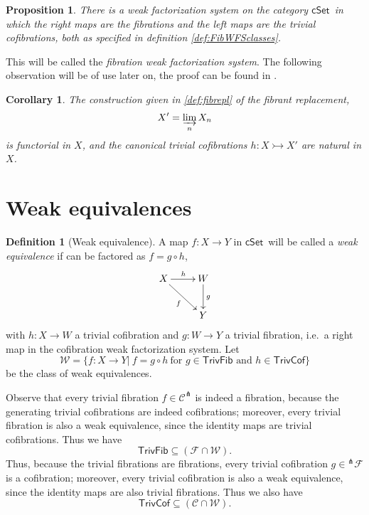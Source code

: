 \documentclass[11pt]{article}
\newcommand{\cSet}{\ensuremath{\mathsf{cSet}}}
\newcommand{\mono}{\ensuremath{\rightarrowtail}}
\newcommand{\ra}{\ensuremath{\rightarrow}}
\newtheorem{proposition}[theorem]{Proposition}
\newtheorem{corollary}[theorem]{Corollary}
\theoremstyle{remark}
\theoremstyle{definition}
\newtheorem{definition}[theorem]{Definition}
\begin{document}
\begin{proposition}
There is a weak factorization system on the category \cSet\ in which the right maps are the fibrations and the left maps are the trivial cofibrations, both as specified in definition \ref{def:FibWFSclasses}.
\end{proposition}

This will be called the \emph{fibration weak factorization system}.
The following observation will be of use later on, the proof can be found in \cite{Garner, Awodey}.

\begin{corollary}
The  construction given in \eqref{def:fibrepl} of the \emph{fibrant replacement}, $$X' = \varinjlim_n X_n$$ is functorial in $X$, and the canonical trivial cofibrations $h:X\mono X'$ are natural in $X$.  
\end{corollary}

\section{Weak equivalences}

\begin{definition}[Weak equivalence]
A map $f: X\to Y$ in \cSet\ will be called a \emph{weak equivalence} if can be factored as $f  = g\circ h$,
\begin{equation*}%
\xymatrix{
X \ar[rd]_{f} \ar[r]^h & W\ar[d]^g\\
& Y
}
\end{equation*}
with $h: X\ra W$ a trivial cofibration and $g: W\ra Y$ a trivial fibration, i.e.\ a right map in the cofibration weak factorization system. Let 
\[
\mathcal{W} = \{f: X\to Y |\ f = g\circ h\ \text{for $g\in\mathsf{TrivFib}$ and $h\in\mathsf{TrivCof}$} \}
\]
 be the class of weak equivalences.
\end{definition}

Observe that every trivial fibration $f\in\mathcal{C}^\pitchfork$ is indeed a fibration, because the generating trivial cofibrations are indeed cofibrations; moreover, every trivial fibration is also a weak equivalence, since the identity maps are trivial cofibrations.  Thus we have
\[
\mathsf{TrivFib} \subseteq (\mathcal{F} \cap \mathcal{W}).
\]
Thus, because the trivial fibrations are fibrations, every trivial cofibration $g\in{^{\pitchfork}\mathcal{F}}$ is a cofibration; moreover, every trivial cofibration is also a weak equivalence, since the identity maps are also trivial fibrations.  Thus we also have
\[
\mathsf{TrivCof} \subseteq (\mathcal{C} \cap \mathcal{W}).
\]
\end{document}
